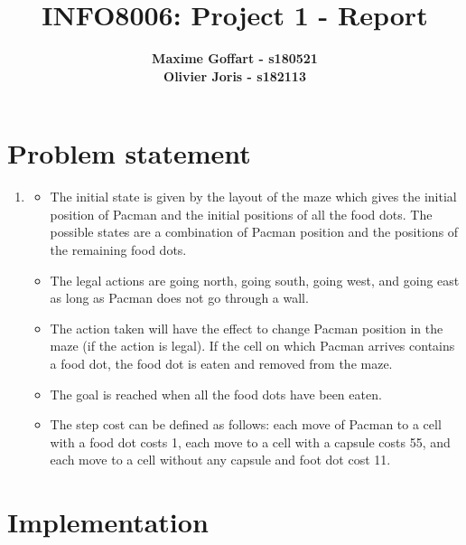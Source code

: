 \documentclass{article}
\begin{document}

\title{\Large{INFO8006: Project 1 - Report}}
\vspace{1cm}
\author{\small{\bf Maxime Goffart - s180521} \\ \small{\bf Olivier Joris - s182113}}

\maketitle


\section{Problem statement}

\begin{enumerate}[label=\alph*.,leftmargin=1.35em]
    \item
    	\begin{itemize}
    		\item The initial state is given by the layout of the maze which gives the initial position of Pacman and the initial positions of all the food dots. The possible states are a combination of Pacman position and the positions of the remaining food dots.
    		\item The legal actions are going north, going south, going west, and going east as long as Pacman does not go through a wall.
    		\item The action taken will have the effect to change Pacman position in the maze (if the action is legal). If the cell on which Pacman arrives contains a food dot, the food dot is eaten and removed from the maze.
    		\item The goal is reached when all the food dots have been eaten.
    		\item The step cost can be defined as follows: each move of Pacman to a cell with a food dot costs 1, each move to a cell with a capsule costs 55, and each move to a cell without any capsule and foot dot cost 11.
    	\end{itemize}
\end{enumerate}

\section{Implementation}
\end{document}
